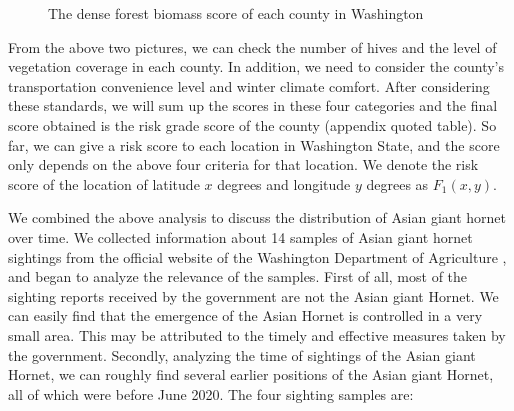 \documentclass{mcmthesis}
\numberwithin{figure}{section}
\numberwithin{table}{section}
\begin{document}
\begin{figure}[H]
  \caption{The dense forest biomass score of each county in Washington}\label{1_2}
\end{figure}

From the above two pictures, we can check the number of hives and the level of vegetation coverage in each county. In addition, we need to consider the county’s transportation convenience level and winter climate comfort. After considering these standards, we will sum up the scores in these four categories and the final score obtained is the risk grade score of the county (appendix quoted table). So far, we can give a risk score to each location in Washington State, and the score only depends on the above four criteria for that location. We denote the risk score of the location of latitude $x$ degrees and longitude $y$ degrees as $F_1(x,y)$.

We combined the above analysis to discuss the distribution of Asian giant hornet over time. We collected information about 14 samples of Asian giant hornet sightings from the official website of the Washington Department of Agriculture \cite{REFURL1}, and began to analyze the relevance of the samples. First of all, most of the sighting reports received by the government are not the Asian giant Hornet. We can easily find that the emergence of the Asian Hornet is controlled in a very small area. This may be attributed to the timely and effective measures taken by the government. Secondly, analyzing the time of sightings of the Asian giant Hornet, we can roughly find several earlier positions of the Asian giant Hornet, all of which were before June 2020. The four sighting samples are:
\end{document}
